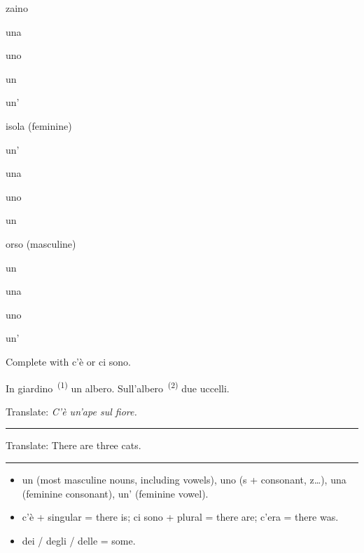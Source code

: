 \documentclass[11pt,a4paper,twoside,openright]{book}
\newcommand{\blank}{\underline{\hspace{2.6cm}}}
\newcommand{\clozeblank}[1]{\underline{\hspace{2.4cm}}\textsuperscript{\,(#1)}}
\newcommand{\answerline}{\par\vspace{6pt}\noindent\rule{0.75\linewidth}{0.4pt}\par}
\begin{document}
\begin{exercises}
\item\label{ex:indefinite-articles-1}\relax \blank{} zaino\par\nopagebreak\begin{options}
\item\relax una
\item\relax uno
\item\relax un
\item\relax un'
\end{options}
\item\label{ex:indefinite-articles-2}\relax \blank{} isola (feminine)\par\nopagebreak\begin{options}
\item\relax un'
\item\relax una
\item\relax uno
\item\relax un
\end{options}
\item\label{ex:indefinite-articles-3}\relax \blank{} orso (masculine)\par\nopagebreak\begin{options}
\item\relax un
\item\relax una
\item\relax uno
\item\relax un'
\end{options}
\item\label{ex:indefinite-articles-4}\relax Complete with c'è or ci sono.\par\smallskip\begingroup\setlength{\parindent}{0pt}In giardino \clozeblank{1} un albero. Sull'albero \clozeblank{2} due uccelli.\par\endgroup
\item\label{ex:indefinite-articles-5}\relax Translate: \textit{C'è un'ape sul fiore.}\par\answerline
\item\label{ex:indefinite-articles-6}\relax Translate: There are three cats.\par\answerline
\end{exercises}

\begin{summarybox}
\begin{itemize}
\item\relax un (most masculine nouns, including vowels), uno (s + consonant, z…), una (feminine consonant), un' (feminine vowel).
\item\relax c'è + singular = there is; ci sono + plural = there are; c'era = there was.
\item\relax dei / degli / delle = some.
\end{itemize}
\end{summarybox}
\end{document}
